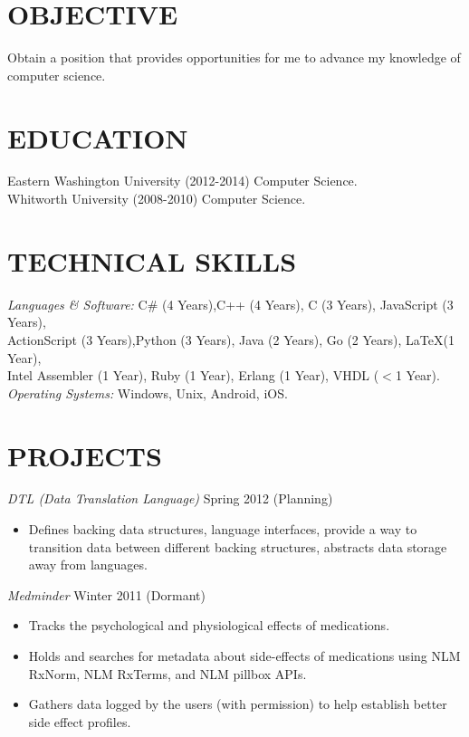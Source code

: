 \documentclass[line]{res}
\begin{document}

\address{509-699-1184 $|$ ericfode@gmail.com}

 
\begin{resume}
 
\section{OBJECTIVE} Obtain a position that provides opportunities for me to advance my knowledge of computer science.

\section{EDUCATION}	Eastern Washington University (2012-2014) Computer Science.\\
					Whitworth University (2008-2010) Computer Science.
					
 
 
\section{TECHNICAL SKILLS} {\sl Languages \& Software:} C\# (4 Years),C++ (4 Years), C (3 Years), JavaScript (3 Years),\\ ActionScript (3 Years),Python (3 Years), Java (2 Years), Go (2 Years), \LaTeX (1 Year),\\ Intel Assembler (1 Year), Ruby (1 Year), Erlang (1 Year), VHDL ($<$1 Year).\\
{\sl Operating Systems:} Windows, Unix, Android, iOS.

                
\section{PROJECTS} 
				{\sl DTL (Data Translation Language)} \hfill Spring 2012 (Planning)
                 \begin{itemize}  \itemsep -2pt %
                 	\item Defines backing data structures, language interfaces, provide a way to transition data between different backing structures, abstracts data storage away from languages.
				 \end{itemize}
				{\sl Medminder} \hfill Winter 2011 (Dormant)
                 \begin{itemize}  \itemsep -2pt %
                	\item Tracks the psychological and physiological effects of medications.
                	\item Holds and searches for metadata about side-effects of medications using NLM RxNorm, NLM RxTerms, and NLM pillbox APIs.
                	\item Gathers data logged by the users (with permission) to help establish better side effect profiles.
                \end{itemize}

\end{resume}
\end{document}
